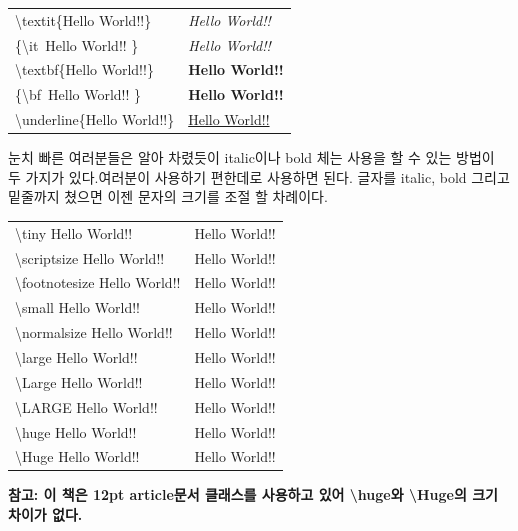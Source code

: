 \documentclass[12pt]{article}
\begin{document}
	\begin{tabularx}{\textwidth \onehalfspacing}{ |X|X| }
		\hline
		\textbackslash textit\{Hello World!!\} & \textit{Hello World!!}\\
		\{\textbackslash it\ Hello World!! \} & {\it Hello World!!}\\
		\hline
		\textbackslash textbf\{Hello World!!\} & \textbf{Hello World!!}\\
		\{\textbackslash bf\ Hello World!! \} & {\bf Hello World!!}\\
		\hline
		\textbackslash underline\{Hello World!!\} & \underline{Hello World!!}\\
		\hline
	\end{tabularx}
	\newline
	\newline
	눈치 빠른 여러분들은 알아 차렸듯이 italic이나 bold 체는 사용을 할 수 있는 방법이 두 가지가 있다.여러분이 사용하기 편한데로 사용하면 된다.
	\clearpage
	글자를 italic, bold 그리고 밑줄까지 쳤으면 이젠 문자의 크기를 조절 할 차례이다.\newline
	
	\begin{tabularx}{\textwidth \onehalfspacing}{|X|X|}
		\hline
		\textbackslash tiny Hello World!! & \tiny Hello World!!\\
		\textbackslash scriptsize Hello World!! & \scriptsize Hello World!!\\
		\textbackslash footnotesize Hello World!! & \footnotesize Hello World!!\\
		\textbackslash small Hello World!! & \small Hello World!!\\
		\textbackslash normalsize Hello World!! & \normalsize Hello World!!\\
		\textbackslash large Hello World!! & \large Hello World!!\\
		\textbackslash Large Hello World!! & \Large Hello World!!\\
		\textbackslash LARGE Hello World!! & \LARGE Hello World!!\\
		\textbackslash huge Hello World!! & \huge Hello World!!\\
		\textbackslash Huge Hello World!! & \Huge Hello World!!\\
		\hline
	\end{tabularx}
	\newline
	\newline
	\textbf{참고: 이 책은 12pt article문서 클래스를 사용하고 있어 \textbackslash huge와 \textbackslash Huge의 크기 차이가 없다.}
	
\end{document}
